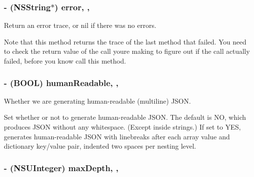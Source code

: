\subsubsection[{error}]{\setlength{\rightskip}{0pt plus 5cm}-\/ (N\+S\+String$\ast$) error\hspace{0.3cm}{\ttfamily [read]}, {\ttfamily [atomic]}, {\ttfamily [copy]}}\label{interface_s_b_json_writer_abc3f1e7299df08c56837d6c8ad135421}


Return an error trace, or nil if there was no errors. 

Note that this method returns the trace of the last method that failed. You need to check the return value of the call you\textquotesingle{}re making to figure out if the call actually failed, before you know call this method. \hypertarget{interface_s_b_json_writer_a16ca84860a2ee76a03b567dc5181a851}{}
\subsubsection[{human\+Readable}]{\setlength{\rightskip}{0pt plus 5cm}-\/ (B\+O\+O\+L) human\+Readable\hspace{0.3cm}{\ttfamily [read]}, {\ttfamily [write]}, {\ttfamily [atomic]}}\label{interface_s_b_json_writer_a16ca84860a2ee76a03b567dc5181a851}


Whether we are generating human-\/readable (multiline) J\+S\+O\+N. 

Set whether or not to generate human-\/readable J\+S\+O\+N. The default is N\+O, which produces J\+S\+O\+N without any whitespace. (Except inside strings.) If set to Y\+E\+S, generates human-\/readable J\+S\+O\+N with linebreaks after each array value and dictionary key/value pair, indented two spaces per nesting level. \hypertarget{interface_s_b_json_writer_a283b4f65ab4d3e1a8112b37dea432689}{}
\subsubsection[{max\+Depth}]{\setlength{\rightskip}{0pt plus 5cm}-\/ (N\+S\+U\+Integer) max\+Depth\hspace{0.3cm}{\ttfamily [read]}, {\ttfamily [write]}, {\ttfamily [atomic]}}\label{interface_s_b_json_writer_a283b4f65ab4d3e1a8112b37dea432689}


